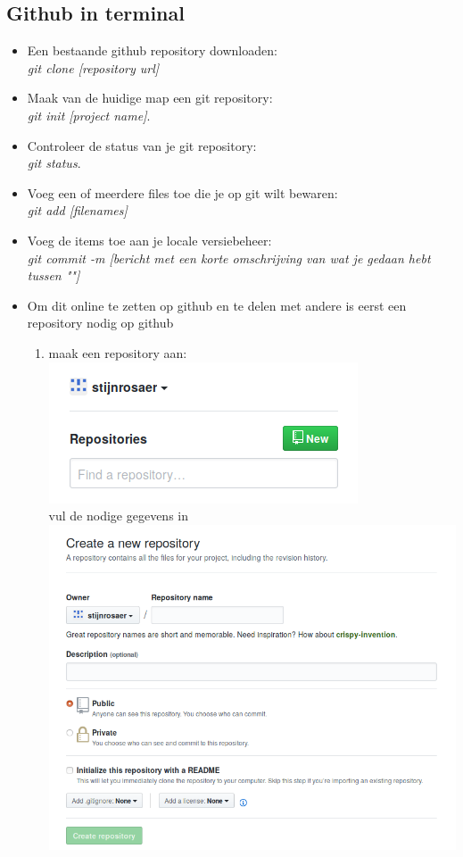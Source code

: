 \documentclass[a4paper, titlepage]{article}
\begin{document}
		\subsection{Github in terminal}
			\begin{itemize}
				\item Een bestaande github repository downloaden:\\ \textit{git clone [repository url]}
				\item Maak van de huidige map een git repository:\\ \textit{git init [project name]}.
				\item Controleer de status van je git repository:\\ \textit{git status}.
				\item Voeg een of meerdere files toe die je op git wilt bewaren:\\ \textit{git add [filenames]}
				\item Voeg de items toe aan je locale versiebeheer:\\ \textit{git commit -m [bericht met een korte omschrijving van wat je gedaan hebt tussen ""]}
				\item Om dit online te zetten op github en te delen met andere is eerst een repository nodig op github
				\begin{enumerate}
					\item maak een repository aan:\\ \includegraphics[scale=0.3]{img/maakrepo}\\ vul de nodige gegevens in\\ \includegraphics[scale=0.2]{img/maakrepo2}

\end{enumerate}
\end{itemize}
\end{document}
